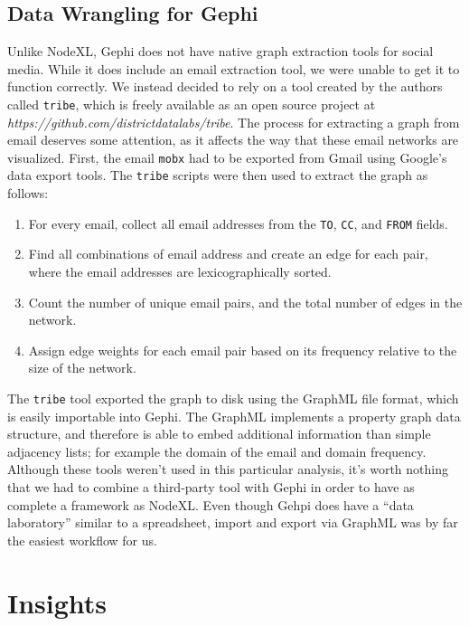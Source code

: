 \documentclass[11pt,letterpaper]{article}
\begin{document}
\subsection*{Data Wrangling for Gephi}

Unlike NodeXL, Gephi does not have native graph extraction tools for social media. While it does include an email extraction tool, we were unable to get it to function correctly. We instead decided to rely on a tool created by the authors called \texttt{tribe}, which is freely available as an open source project at \textit{https://github.com/districtdatalabs/tribe}. The process for extracting a graph from email deserves some attention, as it affects the way that these email networks are visualized. First, the email \texttt{mobx} had to be exported from Gmail using Google's data export tools. The \texttt{tribe} scripts were then used to extract the graph as follows:

\begin{enumerate}
    \item For every email, collect all email addresses from the \texttt{TO}, \texttt{CC}, and \texttt{FROM} fields.
    \item Find all combinations of email address and create an edge for each pair, where the email addresses are lexicographically sorted.
    \item Count the number of unique email pairs, and the total number of edges in the network.
    \item Assign edge weights for each email pair based on its frequency relative to the size of the network.
\end{enumerate}

The \texttt{tribe} tool exported the graph to disk using the GraphML file format, which is easily importable into Gephi. The GraphML implements a property graph data structure, and therefore is able to embed additional information than simple adjacency lists; for example the domain of the email and domain frequency. Although these tools weren't used in this particular analysis, it's worth nothing that we had to combine a third-party tool with Gephi in order to have as complete a framework as NodeXL. Even though Gehpi does have a ``data laboratory'' similar to a spreadsheet, import and export via GraphML was by far the easiest workflow for us.

\section*{Insights}
\end{document}
